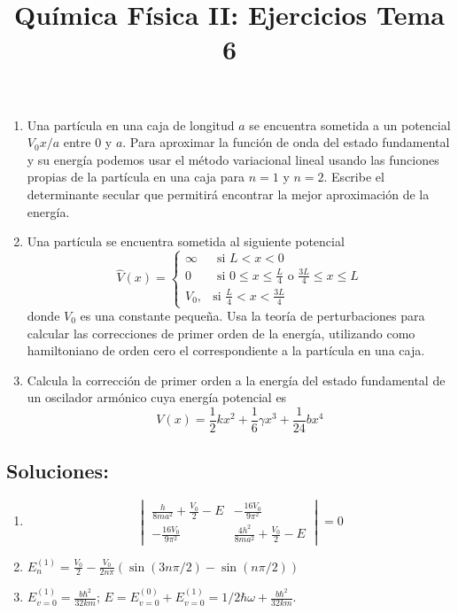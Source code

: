 \documentclass{tufte-handout}
\title[Química Física II: Ejercicios Tema 6]{
Química Física II: Ejercicios Tema 6}
\date{}  %
\begin{document}
\maketitle
\large 
\begin{enumerate}
    \item Una partícula en una caja de longitud $a$ se encuentra sometida a un
    potencial $V_0x/a$ entre $0$ y $a$. Para aproximar la función de onda
    del estado fundamental y su energía podemos usar el método variacional 
    lineal usando las funciones propias de la partícula en una caja para $n=1$
    y $n=2$. Escribe el determinante secular que permitirá encontrar la mejor 
    aproximación de la energía.
    \item Una partícula se encuentra sometida al siguiente potencial
    \begin{equation*}
\hat{V}(x)=
\begin{cases}
  \infty & \text{ si } L<x<0\\
  0  & \text{ si } 0\leq x\leq \frac{L}{4}\text{  o  }\frac{3L}{4}\leq x\leq L
\\
  V_0, & \text{si } \frac{L}{4}<x<\frac{3L}{4}
\end{cases}
\end{equation*}
    donde $V_0$ es una constante pequeña. Usa la teoría de perturbaciones
    para calcular las correcciones de primer orden de la energía, utilizando
    como hamiltoniano de orden cero el correspondiente a la partícula en 
    una caja.
    
    \item Calcula la corrección de primer orden a la energía del 
    estado fundamental de un oscilador armónico cuya energía potencial 
    es 
    \begin{equation*}
        V(x)=\frac{1}{2}kx^2 + \frac{1}{6}\gamma x^3  + \frac{1}{24}bx^4
    \end{equation*}
\end{enumerate}

\newpage
\subsection{\textbf{Soluciones:}}
\begin{enumerate}
\item 
\begin{equation}\begin{vmatrix}
  \frac{h}{8ma^2} + \frac{V_0}{2} - E & -\frac{16V_0}{9\pi^2} \\
 -\frac{16V_0}{9\pi^2} &  \frac{4h^2}{8ma^2} + \frac{V_0}{2} - E 
\end{vmatrix} = 0
\end{equation}
\item $E_n^{(1)}=\frac{V_0}{2}  - \frac{V_0}{2n\pi}(\sin(3n\pi/2) - \sin(n\pi/2))$
\item $E_{v=0}^{(1)}= \frac{b\hbar^2}{32km}$; $E=E_{v=0}^{(0)}+E_{v=0}^{(1)}= 1/2\hbar\omega +  \frac{b\hbar^2}{32km}$.
\end{enumerate}
\end{document}
